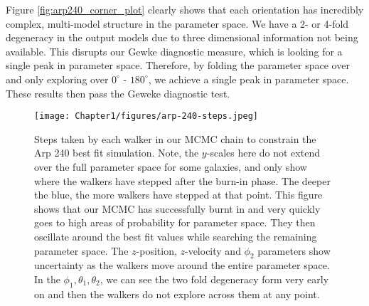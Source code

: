 Figure \ref{fig:arp240_corner_plot} clearly shows that each orientation has incredibly complex, multi-model structure in the parameter space. We have a 2- or 4-fold degeneracy in the output models due to three dimensional information not being available. This disrupts our Gewke diagnostic measure, which is looking for a single peak in parameter space. Therefore, by folding the parameter space over and only exploring over $0^{\circ}$ - $180^{\circ}$, we achieve a single peak in parameter space. These results then pass the Geweke diagnostic test.

\begin{figure}
\centering
\texttt{[image: Chapter1/figures/arp-240-steps.jpeg]}
\caption[Steps taken by each walker in our MCMC chain to constrain the Arp 240 best fit simulation.]{Steps taken by each walker in our MCMC chain to constrain the Arp 240 best fit simulation. Note, the $y$-scales here do not extend over the full parameter space for some galaxies, and only show where the walkers have stepped after the burn-in phase. The deeper the blue, the more walkers have stepped at that point. This figure shows that our MCMC has successfully burnt in and very quickly goes to high areas of probability for parameter space. They then oscillate around the best fit values while searching the remaining parameter space. The $z$-position, $z$-velocity and $\phi_{2}$ parameters show \DIFdelbeginFL {}\DIFdelendFL \DIFaddbeginFL {}\DIFaddendFL uncertainty as the walkers move around the entire parameter space. In the $\phi_{1}, \theta_{1}, \theta_{2}$, we can see the two fold degeneracy form very early on and then the walkers do not explore across them at any point.}
\label{fig:walker_steps}
\end{figure}

